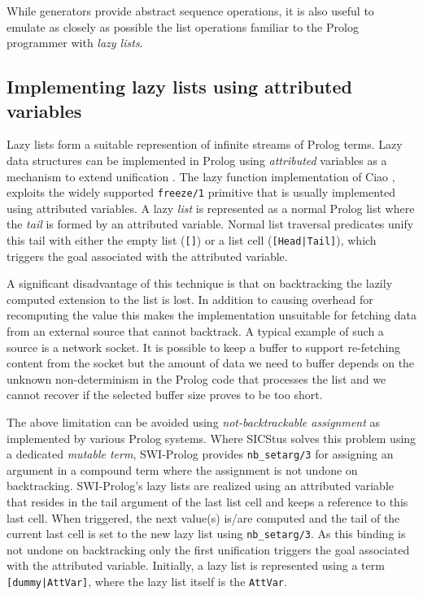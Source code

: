 \documentclass{new_tlp}
\begin{document}
While generators provide abstract sequence operations, it is also useful
to emulate as closely as possible the  list operations familiar to the 
Prolog programmer with {\em lazy lists}.

\subsection{Implementing lazy lists using attributed variables}

Lazy lists form a suitable represention of infinite streams of Prolog
terms. Lazy data structures can be implemented in Prolog using
\emph{attributed} variables as a mechanism to extend unification
\cite{10.1007/3-540-55844-6_141}. The lazy function implementation of
Ciao \cite{casas2005functional,lazyCiao}, exploits the widely supported
\texttt{freeze/1} primitive that is usually implemented using attributed
variables. A lazy \emph{list} is represented as a normal Prolog list where the
\emph{tail} is formed by an attributed variable. Normal list traversal
predicates unify this tail with either the empty list (\texttt{[]}) or a
list cell (\texttt{[Head|Tail]}), which triggers the goal associated
with the attributed variable.

A significant disadvantage of this technique is that on backtracking the
lazily computed extension to the list is lost. In addition to causing
overhead for recomputing the value this makes the implementation
unsuitable for fetching data from an external source that cannot
backtrack. A typical example of such a source is a network socket. It is
possible to keep a buffer to support re-fetching content from the socket
but the amount of data we need to buffer depends on the unknown
non-determinism in the Prolog code that processes the list and we cannot
recover if the selected buffer size proves to be too short.

The above limitation can be avoided using \emph{not-backtrackable
assignment} as implemented by various Prolog systems. Where SICStus
solves this problem using a dedicated \emph{mutable term}, SWI-Prolog
provides
\texttt{nb\_setarg/3}
for assigning an argument in a compound term where the assignment is not
undone on backtracking. SWI-Prolog's lazy lists are realized using an
attributed variable that resides in the tail argument of the last list
cell and keeps a reference to this last cell. When triggered, the next
value(s) is/are computed and the tail of the current last cell is set to
the new lazy list using \texttt{nb\_setarg/3}. As this binding is not
undone on backtracking only the first unification triggers the goal
associated with the attributed variable. Initially, a lazy list is
represented using a term \texttt{[dummy|AttVar]}, where the lazy list
itself is the  \texttt{AttVar}.
\end{document}
